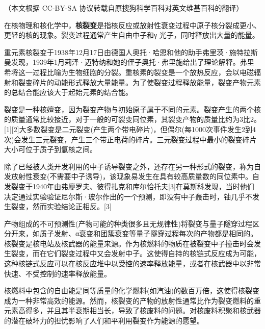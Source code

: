 
（本文根据 CC-BY-SA 协议转载自原搜狗科学百科对英文维基百科的翻译）

在核物理和核化学中，\textbf{核裂变}是指核反应或放射性衰变过程中原子核分裂成更小、更轻的核的现象。裂变过程通常产生自由中子和γ 光子，同时释放出大量的能量。

重元素核裂变于1938年12月17日由德国人奥托·哈恩和他的助手弗里茨·施特拉斯曼发现，1939年1月莉泽·迈特纳和她的侄子奥托·弗里施给出了理论解释。弗里希将这一过程比喻为生物细胞的分裂。重核素的裂变是一个放热反应，会以电磁辐射和裂变碎片的动能形式释放大量能量。为了使裂变过程释放能量，裂变产物元素的总结合能应该大于起始元素的结合能。

裂变是一种核嬗变，因为裂变产物与初始原子属于不同的元素。裂变产生的两个核的质量通常比较接近，对于一般的可裂变同位素，其裂变产物的质量比约为3比2。[1][2]大多数裂变是二元裂变(产生两个带电碎片)，但偶尔(每1000次事件发生2到4次)会发生三元裂变，产生三个带正电荷的碎片。三元裂变过程中最小的裂变碎片大小可位于质子到氩核之间。

除了已经被人类开发利用的中子诱导裂变之外，还存在另一种形式的裂变，称为自发放射性衰变(不需要中子诱导)，该现象易发生在具有较高质量数的同位素中。自发裂变于1940年由弗廖罗夫、彼得扎克和库尔恰托夫[3]在莫斯科发现，当时他们决定通过实验验证尼尔斯·玻尔作出的一个预测，即没有中子轰击时，铀几乎不发生裂变，然而实验结论正相反。[3]

产物组成的不可预测性(产物可能的种类很多且无规律性)将裂变与量子隧穿过程区分开来，如质子发射、α衰变和团簇衰变等量子隧穿过程每次的产物都是相同的。核裂变是核电站及核武器的能量来源。作为核燃料的物质在被裂变中子撞击时会发生裂变，而在它们裂变过程中又会发射中子。这使得自持的核链式反应成为可能，这种核链式反应可以在核反应堆中以受控的速率释放能量，或者在核武器中以非常快速、不受控制的速率释放能量。

核燃料中包含的自由能是同等质量的化学燃料(如汽油)的数百万倍，这使得核裂变成为一种非常高效的能源。然而，核裂变的产物的放射性通常比作为裂变燃料的重元素高得多，并且其半衰期相当长，导致了核废料的问题。对核废料积聚和核武器的潜在破坏力的担忧影响了人们和平利用裂变作为能源的愿望。